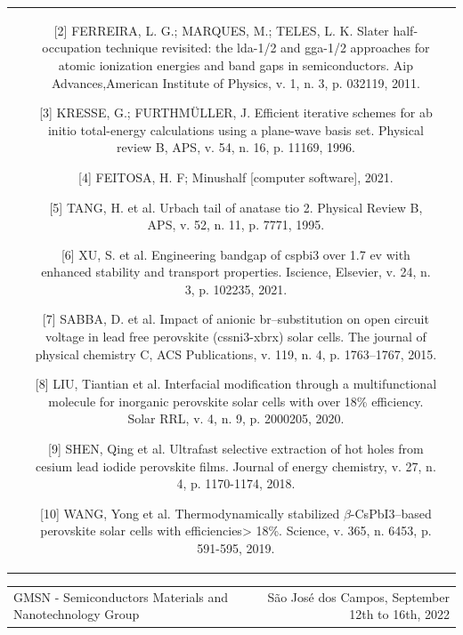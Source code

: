 \documentclass[a0,portrait]{a0poster}
\begin{document}
\begin{table}[hhh]
\begin{tabular}{cr}
\begin{minipage}{35cm}
{\begin{itemize}[labelindent=1em]
\item[{[2]}]FERREIRA, L. G.; MARQUES, M.; TELES, L. K. Slater half-occupation technique revisited: the lda-1/2 and gga-1/2 approaches for atomic ionization energies and band gaps in semiconductors. Aip Advances,American Institute of Physics, v. 1, n. 3, p. 032119, 2011.

\item[{[3]}]KRESSE, G.; FURTHMÜLLER, J. Efficient iterative schemes for ab initio total-energy calculations using a plane-wave basis set. Physical review B, APS, v. 54, n. 16, p. 11169, 1996.

\item[{[4]}]FEITOSA, H. F; Minushalf [computer software], 2021.

\item[{[5]}]TANG, H. et al. Urbach tail of anatase tio 2. Physical Review B, APS, v. 52, n. 11, p. 7771, 1995.

\item[{[6]}]XU, S. et al. Engineering bandgap of cspbi3 over 1.7 ev with enhanced stability and transport properties. Iscience, Elsevier, v. 24, n. 3, p. 102235, 2021.

\item[{[7]}]SABBA, D. et al. Impact of anionic br–substitution on open circuit voltage in lead free perovskite (cssni3-xbrx) solar cells. The journal of physical chemistry C, ACS Publications, v. 119, n. 4, p. 1763–1767, 2015.

\item[{[8]}]LIU, Tiantian et al. Interfacial modification through a multifunctional molecule for inorganic perovskite solar cells with over 18\% efficiency. Solar RRL, v. 4, n. 9, p. 2000205, 2020.

\item[{[9]}]SHEN, Qing et al. Ultrafast selective extraction of hot holes from cesium lead iodide perovskite films. Journal of energy chemistry, v. 27, n. 4, p. 1170-1174, 2018.

\item[{[10]}]WANG, Yong et al. Thermodynamically stabilized $\beta$-CsPbI3–based perovskite solar cells with efficiencies> 18\%. Science, v. 365, n. 6453, p. 591-595, 2019.

\end{itemize}
}
\end{minipage}

\end{tabular}
\end{table}


\vspace{0.8cm}
\begin{tabular*}{\columnwidth}{@{\extracolsep{\fill}}lr}
\toprule
\small GMSN - Semiconductors Materials and Nanotechnology Group & \small São José dos Campos, September 12th to 16th, 2022

\end{tabular*}
\end{document}

